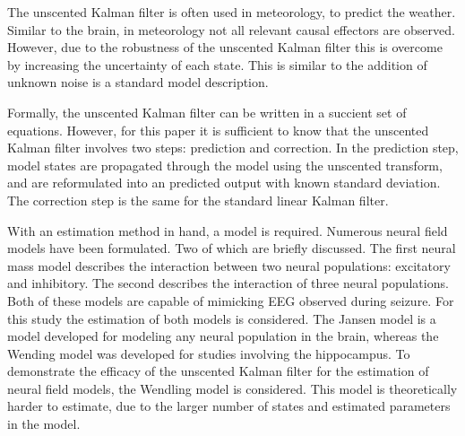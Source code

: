 The unscented Kalman filter is often used in meteorology, to predict the weather. Similar to the brain, in meteorology not all relevant causal effectors are observed. However, due to the robustness of the unscented Kalman filter this is overcome by increasing the uncertainty of each state. This is similar to the addition of unknown noise is a standard model description.

Formally, the unscented Kalman filter can be written in a succient set of equations\iref. However, for this paper it is sufficient to know that the unscented Kalman filter involves two steps: prediction and correction. In the prediction step, model states are propagated through the model using the unscented transform, and are reformulated into an predicted output with known standard deviation. The correction step is the same for the standard linear Kalman filter\iref.

With an estimation method in hand, a model is required. Numerous neural field models have been formulated. Two of which are briefly discussed. The first neural mass model describes the interaction between two neural populations: excitatory and inhibitory\iref. The second describes the interaction of three neural populations\iref. Both of these models are capable of mimicking EEG observed during seizure\iref. For this study the estimation of both models is considered. The Jansen model is a model developed for modeling any neural population in the brain, whereas the Wending model was developed for studies involving the hippocampus. To demonstrate the efficacy of the unscented Kalman filter for the estimation of neural field models, the Wendling model is considered. This model is theoretically harder to estimate, due to the larger number of states and estimated parameters in the model.

